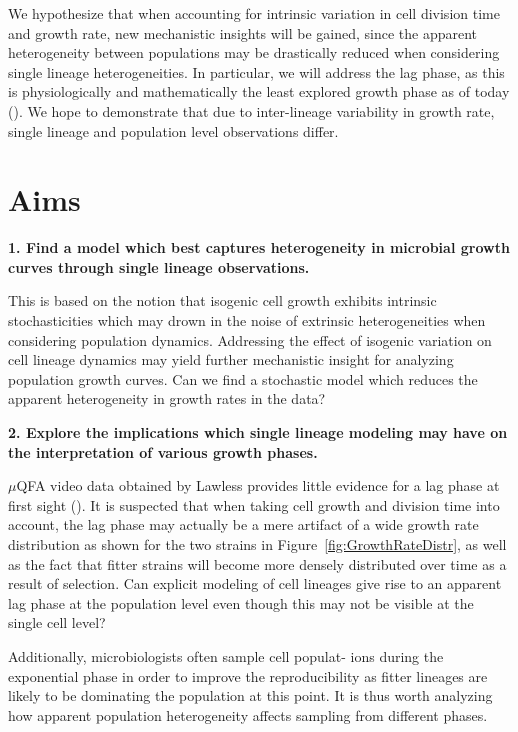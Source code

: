 \documentclass{bioinfo}
\begin{document}
We hypothesize that when accounting for intrinsic variation in cell division time and growth rate, new mechanistic insights will be gained, since the apparent heterogeneity between populations may be drastically reduced when considering single lineage heterogeneities. In particular, we will address the lag phase, as this is physiologically and mathematically the least explored growth phase as of today (\citealp{Rolfe12}). We hope to demonstrate that due to inter-lineage variability in growth rate, single lineage and population level observations differ. 

\section{Aims}

\textbf{1. Find a model which best captures heterogeneity in microbial growth curves through single lineage observations.}
\begin{addmargin}[1.5em]{1.5em}
This is based on the notion that isogenic cell growth exhibits intrinsic stochasticities which may drown in the noise of extrinsic heterogeneities when considering population dynamics. Addressing the effect of isogenic variation on cell lineage dynamics may yield further mechanistic insight for analyzing population growth curves. Can we find a stochastic model which reduces the apparent heterogeneity in growth rates in the data?
\end{addmargin}

\textbf{2. Explore the implications which single lineage modeling may have on the interpretation of various growth phases.} 
\begin{addmargin}[1.5em]{1.5em}
$\mu$QFA video data obtained by Lawless provides little evidence for a lag phase at first sight (\citealp{Lawless13}). It is suspected that when taking cell growth and division time into account, the lag phase may actually be a mere artifact of a wide growth rate distribution as shown for the two strains in Figure~\ref{fig:GrowthRateDistr}, as  well as the fact that fitter strains will become more densely distributed over time as a result of selection. Can explicit modeling of cell lineages give rise to an apparent lag phase at the population level even though this may not be visible at the single cell level? 

Additionally, microbiologists often sample cell populat- ions during the exponential phase in order to improve the reproducibility as fitter lineages are likely to be dominating the population at this point. It is thus worth analyzing how apparent population heterogeneity affects sampling from different phases.
\end{addmargin}
\end{document}
